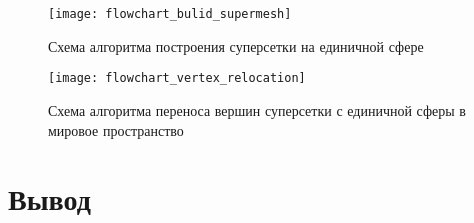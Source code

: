 \begin{figure}[H]
    \label{fig:flowchart_build_supermesh}
    \texttt{[image: flowchart\_bulid\_supermesh]}
    \caption{Схема алгоритма построения суперсетки на единичной сфере}
\end{figure}

\begin{figure}[H]
    \label{fig:flowchart_vertex_relocation}
    \texttt{[image: flowchart\_vertex\_relocation]}
    \caption{Схема алгоритма переноса вершин суперсетки с единичной сферы в мировое пространство}
\end{figure}


\section*{Вывод}

\clearpage